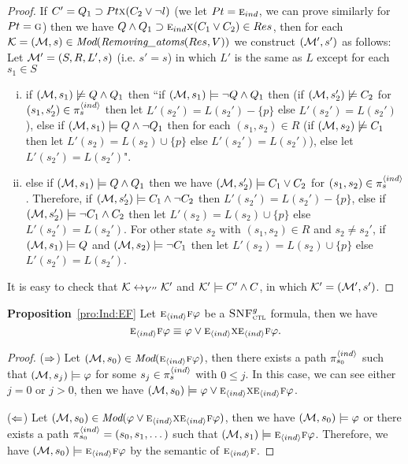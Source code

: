 \documentclass[letterpaper]{article}
\begin{document}
\begin{proof}
If $C'= Q_1\supset Pt \textsc{x} (C_2 \vee \neg l)$ (we let $Pt=\textsc{e}_{ind}$, we can prove similarly for $Pt = \textsc{g}$) then we have $Q \wedge Q_1 \supset \textsc{e}_{ind} \textsc{x}(C_1 \vee C_2) \in Res$, then for each ${\cal K}=({\cal M}, s)\in \textit{Mod}(\emph{Removing\_atoms}(Res, V))$ we construct $({\cal M}',s')$ as follows: Let ${\cal M}'= (S, R, L',s)$ (i.e. $s'=s$) in which $L'$ is the same as $L$ except for each $s_1\in S$
\begin{enumerate}[(i)]
    \item if $({\cal M}, s_1) \not \models Q \wedge Q_1$ then ``if $({\cal M}, s_1) \models \neg Q \wedge Q_1$ then (if $({\cal M}, s_2') \not \models C_2$ for $(s_1, s_2') \in \pi_s^{{\langle{ind}\rangle}}$ then let $L'(s_2') = L(s_2') - \{p\}$ else $L'(s_2') = L(s_2')$), else if $({\cal M}, s_1) \models Q \wedge \neg Q_1$ then for each $(s_1, s_2) \in R$ (if $({\cal M}, s_2) \not \models C_1$ then let $L'(s_2) = L(s_2) \cup \{p\}$ else $L'(s_2') = L(s_2')$), else let $L'(s_2') = L(s_2')$".
    \item else if $({\cal M}, s_1) \models Q \wedge Q_1$ then we have $({\cal M},s_2') \models C_1 \vee C_2$ for $(s_1, s_2) \in \pi_s^{{\langle{ind}\rangle}}$. Therefore, if $({\cal M}, s_2') \models C_1 \wedge \neg C_2$ then $L'(s_2') = L(s_2') - \{p\}$, else if  $({\cal M}, s_2') \models \neg C_1 \wedge C_2$ then let $L'(s_2) = L(s_2) \cup \{p\}$ else $L'(s_2') = L(s_2')$. For other state $s_2$ with $(s_1, s_2) \in R$ and $s_2 \not = s_2'$, if $({\cal M}, s_1) \models Q$ and $({\cal M}, s_2) \models \neg C_1$ then let $L'(s_2) = L(s_2) \cup \{p\}$ else $L'(s_2') = L(s_2')$.
\end{enumerate}
It is easy to check that ${\cal K} \leftrightarrow_{V''} {\cal K}'$ and ${\cal K}' \models C' \wedge C$, in which ${\cal K}' = ({\cal M}',s')$.  
\end{proof}


\noindent\textbf{Proposition}~\ref{pro:Ind:EF}
Let $\textsc{e}_{{\langle{ind}\rangle}} \textsc{f} \varphi$ be a ${\textsc{SNF}_{\textsc{ctl}}^g}$ formula, then we have 
\[
\textsc{e}_{{\langle{ind}\rangle}} \textsc{f} \varphi \equiv \varphi \vee \textsc{e}_{{\langle{ind}\rangle}} \textsc{x} \textsc{e}_{{\langle{ind}\rangle}}\textsc{f} \varphi.
\]
\begin{proof}
($\Rightarrow$) Let $({\cal M}, s_0) \in \textit{Mod}(\textsc{e}_{{\langle{ind}\rangle}} \textsc{f} \varphi)$, then there exists a path $\pi_{s_0}^{{\langle{ind}\rangle}}$ such that $({\cal M}, s_j) \models \varphi$ for some $s_j \in \pi_s^{{\langle{ind}\rangle}}$ with $0 \leq j$. In this case, we can see either $j=0$ or $j > 0$, then we have $({\cal M}, s_0) \models  \varphi \vee \textsc{e}_{{\langle{ind}\rangle}} \textsc{x} \textsc{e}_{{\langle{ind}\rangle}}\textsc{f} \varphi$.

($\Leftarrow$) Let $({\cal M}, s_0) \in \textit{Mod}(\varphi \vee \textsc{e}_{{\langle{ind}\rangle}} \textsc{x} \textsc{e}_{{\langle{ind}\rangle}}\textsc{f} \varphi)$, then we have $({\cal M},s_0) \models \varphi$ or there exists a path $\pi_{s_0}^{{\langle{ind}\rangle}} = (s_0, s_1, \dots)$ such that $({\cal M}, s_1) \models \textsc{e}_{{\langle{ind}\rangle}}\textsc{f} \varphi$. Therefore, we have $({\cal M}, s_0) \models \textsc{e}_{{\langle{ind}\rangle}} \textsc{f} \varphi$ by the semantic of $\textsc{e}_{{\langle{ind}\rangle}}\textsc{f}$.
\end{proof}
\end{document}
